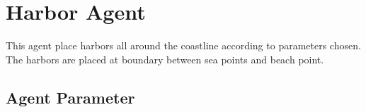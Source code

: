 \documentclass[12pt]{article}
\begin{document}
    \begin{figure}[H]
        \centering     %
    \end{figure}

    \newpage
 
    \section{Harbor Agent}
    This agent place harbors all around the coastline according to parameters chosen. The harbors are placed at boundary between sea points and beach point. 
    
    \subsection{Agent Parameter}
\end{document}
